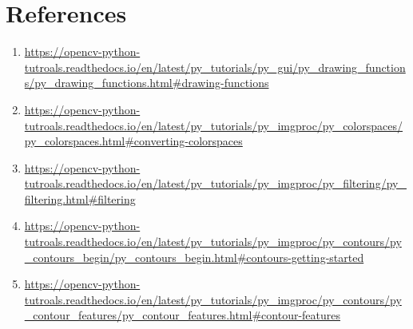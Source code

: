 \documentclass[11pt,a4paper]{article}
\begin{document}
	\section{References}
		\begin{enumerate}
			\item \url{https://opencv-python-tutroals.readthedocs.io/en/latest/py_tutorials/py_gui/py_drawing_functions/py_drawing_functions.html#drawing-functions}
			\item \url{https://opencv-python-tutroals.readthedocs.io/en/latest/py_tutorials/py_imgproc/py_colorspaces/py_colorspaces.html#converting-colorspaces}
			\item \url{https://opencv-python-tutroals.readthedocs.io/en/latest/py_tutorials/py_imgproc/py_filtering/py_filtering.html#filtering}
			\item \url{https://opencv-python-tutroals.readthedocs.io/en/latest/py_tutorials/py_imgproc/py_contours/py_contours_begin/py_contours_begin.html#contours-getting-started}
			\item \url{https://opencv-python-tutroals.readthedocs.io/en/latest/py_tutorials/py_imgproc/py_contours/py_contour_features/py_contour_features.html#contour-features}
		\end{enumerate}
			
\end{document}
